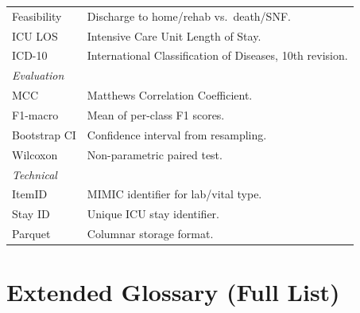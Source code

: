 \begin{table}[h]
\begin{tabular}{ll}
\midrule
Feasibility & Discharge to home/rehab vs.\ death/SNF. \\
ICU LOS & Intensive Care Unit Length of Stay. \\
ICD-10 & International Classification of Diseases, 10th revision. \\
\midrule
\multicolumn{2}{l}{\textit{Evaluation}} \\
\midrule
MCC & Matthews Correlation Coefficient. \\
F1-macro & Mean of per-class F1 scores. \\
Bootstrap CI & Confidence interval from resampling. \\
Wilcoxon & Non-parametric paired test. \\
\midrule
\multicolumn{2}{l}{\textit{Technical}} \\
\midrule
ItemID & MIMIC identifier for lab/vital type. \\
Stay ID & Unique ICU stay identifier. \\
Parquet & Columnar storage format. \\
\bottomrule
\end{tabular}
\label{tab:glossary_full}
\end{table}

\section{Extended Glossary (Full List)}

